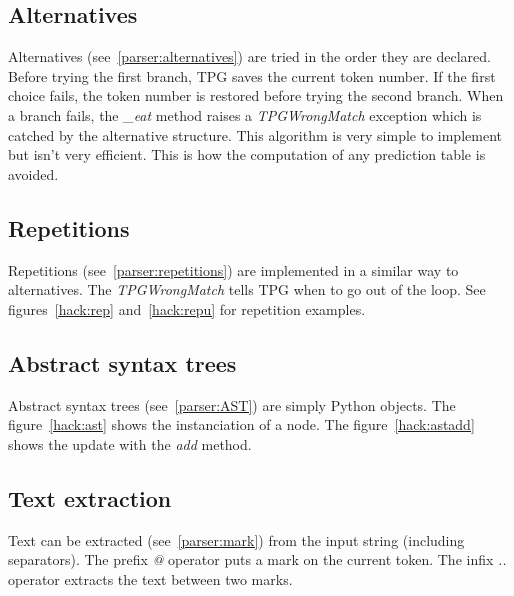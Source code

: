 
\clearpage
\subsection{Alternatives}									\label{hack:alternatives}

Alternatives (see~\ref{parser:alternatives}) are tried in the order they are declared.
Before trying the first branch, TPG saves the current token number.
If the first choice fails, the token number is restored before trying the second branch.
When a branch fails, the \emph{\_eat} method raises a \emph{TPGWrongMatch} exception which is catched by the alternative structure.
This algorithm is very simple to implement but isn't very efficient.
This is how the computation of any prediction table is avoided.


\clearpage
\subsection{Repetitions}									\label{hack:repetitions}

Repetitions (see~\ref{parser:repetitions}) are implemented in a similar way to alternatives.
The \emph{TPGWrongMatch} tells TPG when to go out of the loop.
See figures~\ref{hack:rep} and~\ref{hack:repu} for repetition examples.


\clearpage
\subsection{Abstract syntax trees}

Abstract syntax trees (see~\ref{parser:AST}) are simply Python objects.
The figure~\ref{hack:ast} shows the instanciation of a node.
The figure~\ref{hack:astadd} shows the update with the \emph{add} method.


\clearpage
\subsection{Text extraction}

Text can be extracted (see~\ref{parser:mark}) from the input string (including separators).
The prefix \emph{@} operator puts a mark on the current token.
The infix \emph{..} operator extracts the text between two marks.

